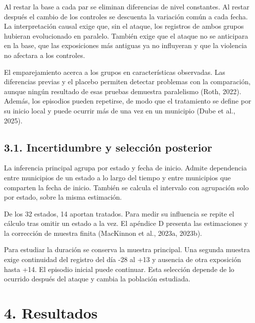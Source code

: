 \documentclass[11pt,letterpaper]{article}
\begin{document}
Al restar la base a cada par se eliminan diferencias de nivel constantes. Al restar después el cambio de los controles se descuenta la variación común a cada fecha. La interpretación causal exige que, sin el ataque, los registros de ambos grupos hubieran evolucionado en paralelo. También exige que el ataque no se anticipara en la base, que las exposiciones más antiguas ya no influyeran y que la violencia no afectara a los controles.\par

El emparejamiento acerca a los grupos en características observadas. Las diferencias previas y el placebo permiten detectar problemas con la comparación, aunque ningún resultado de esas pruebas demuestra paralelismo (Roth, 2022). Además, los episodios pueden repetirse, de modo que el tratamiento se define por su inicio local y puede ocurrir más de una vez en un municipio (Dube et al., 2025).\par

\subsection*{3.1. Incertidumbre y selección posterior}

La inferencia principal agrupa por estado y fecha de inicio. Admite dependencia entre municipios de un estado a lo largo del tiempo y entre municipios que comparten la fecha de inicio. También se calcula el intervalo con agrupación solo por estado, sobre la misma estimación.\par

De los 32 estados, 14 aportan tratados. Para medir su influencia se repite el cálculo tras omitir un estado a la vez. El apéndice D presenta las estimaciones y la corrección de muestra finita (MacKinnon et al., 2023a, 2023b).\par

Para estudiar la duración se conserva la muestra principal. Una segunda muestra exige continuidad del registro del día -28 al +13 y ausencia de otra exposición hasta +14. El episodio inicial puede continuar. Esta selección depende de lo ocurrido después del ataque y cambia la población estudiada.\par


\section*{4. Resultados}
\end{document}
